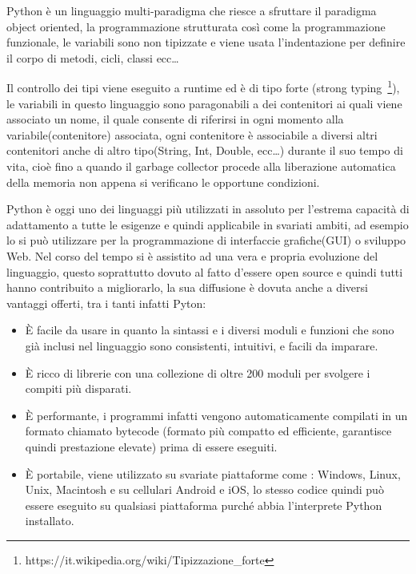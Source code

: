Python è un linguaggio multi-paradigma che riesce a sfruttare il paradigma object oriented, la programmazione strutturata così come la  programmazione funzionale, le 
variabili sono non tipizzate e viene usata l'indentazione per definire il corpo di metodi, cicli, classi ecc\dots

Il controllo dei tipi viene eseguito a runtime ed è di tipo forte (strong typing~\footnote{https://it.wikipedia.org/wiki/Tipizzazione\_forte}), le variabili in questo 
linguaggio sono paragonabili a dei contenitori ai quali viene associato un nome, il quale consente di riferirsi in ogni momento alla variabile(contenitore) associata, 
ogni contenitore è associabile a diversi altri contenitori anche di altro tipo(String, Int, Double, ecc\dots) durante il suo tempo di vita, cioè fino a quando il 
garbage collector procede alla liberazione automatica della memoria non appena si verificano le opportune condizioni.

Python è oggi uno dei linguaggi più utilizzati in assoluto per l'estrema capacità di adattamento a tutte le esigenze e quindi applicabile in svariati ambiti, ad
esempio lo si può utilizzare per la programmazione di interfaccie grafiche(GUI) o sviluppo Web.
Nel corso del tempo si è assistito ad una vera e propria evoluzione del linguaggio, questo soprattutto dovuto al fatto d'essere open source e quindi tutti hanno 
contribuito a migliorarlo, la sua diffusione è dovuta anche a diversi vantaggi offerti, tra i tanti infatti Pyton:
\begin{itemize}
    \item È facile da usare in quanto la sintassi e i diversi moduli e funzioni che sono già inclusi nel linguaggio sono consistenti, intuitivi, e facili da imparare.
    \item È ricco di librerie con una collezione di oltre 200 moduli per svolgere i compiti più disparati.
    \item È performante, i programmi infatti vengono automaticamente compilati in un formato chiamato bytecode (formato più compatto ed efficiente, 
    garantisce quindi prestazione elevate) prima di essere eseguiti.
    \item È portabile, viene utilizzato su svariate piattaforme come : Windows, Linux, Unix, Macintosh e su cellulari Android e iOS, lo stesso codice quindi può essere 
    eseguito su qualsiasi piattaforma purché abbia l'interprete Python installato.
\end{itemize}



